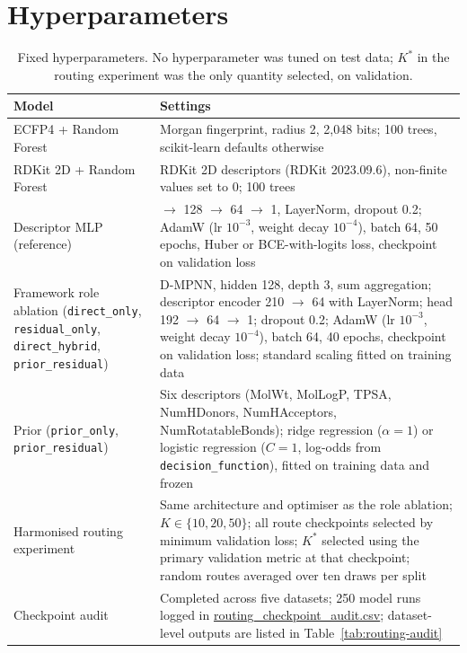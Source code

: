 \documentclass[10pt,a4paper]{article}
\renewcommand{\thetable}{S\arabic{table}}
\newcommand{\cfg}[1]{\texttt{#1}}
\begin{document}
\section*{Hyperparameters}


\begin{table}[H]
\renewcommand{\thetable}{S2}
\caption{Fixed hyperparameters. No hyperparameter was tuned on test data; $K^*$ in the routing experiment was the only quantity selected, on validation.}\label{tab:hp}
\centering\footnotesize
\begin{tabular}{@{}>{\raggedright\arraybackslash}p{}>{\raggedright\arraybackslash}p{}@{}}
\toprule
Model & Settings \\
\midrule
ECFP4 + Random Forest & Morgan fingerprint, radius 2, 2,048 bits; 100 trees, scikit-learn defaults otherwise \\
RDKit 2D + Random Forest & 210 RDKit 2D descriptors (RDKit 2023.09.6), non-finite values set to 0; 100 trees \\
Descriptor MLP (reference) & 210 $\rightarrow$ 128 $\rightarrow$ 64 $\rightarrow$ 1, LayerNorm, dropout 0.2; AdamW (lr $10^{-3}$, weight decay $10^{-4}$), batch 64, 50 epochs, Huber or BCE-with-logits loss, checkpoint on validation loss \\
Framework role ablation (\cfg{direct\_only}, \cfg{residual\_only}, \cfg{direct\_hybrid}, \cfg{prior\_residual}) & D-MPNN, hidden 128, depth 3, sum aggregation; descriptor encoder 210 $\rightarrow$ 64 with LayerNorm; head 192 $\rightarrow$ 64 $\rightarrow$ 1; dropout 0.2; AdamW (lr $10^{-3}$, weight decay $10^{-4}$), batch 64, 40 epochs, checkpoint on validation loss; standard scaling fitted on training data \\
Prior (\cfg{prior\_only}, \cfg{prior\_residual}) & Six descriptors (MolWt, MolLogP, TPSA, NumHDonors, NumHAcceptors, NumRotatableBonds); ridge regression ($\alpha=1$) or logistic regression ($C=1$, log-odds from \cfg{decision\_function}), fitted on training data and frozen \\
Harmonised routing experiment & Same architecture and optimiser as the role ablation; $K\in\{10,20,50\}$; all route checkpoints selected by minimum validation loss; $K^*$ selected using the primary validation metric at that checkpoint; random routes averaged over ten draws per split \\
Checkpoint audit & Completed across five datasets; 250 model runs logged in \url{routing_checkpoint_audit.csv}; dataset-level outputs are listed in Table~\ref{tab:routing-audit} \\

\end{tabular}
\end{table}
\end{document}
